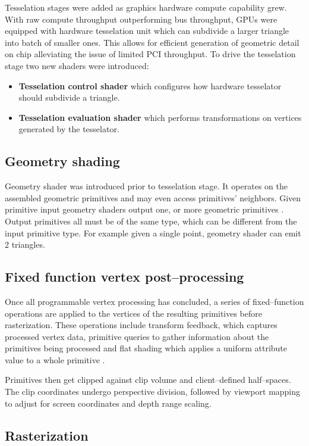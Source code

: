 Tesselation stages were added as graphics hardware compute capability grew. With raw compute throughput outperforming bus throughput, GPUs were equipped with hardware
tesselation unit which can subdivide a larger triangle into batch of smaller ones. This allows for efficient generation of geometric detail on chip alleviating the 
issue of limited PCI throughput.
To drive the tesselation stage two new shaders were introduced:
\begin{itemize}
    \item \textbf{Tesselation control shader} which configures how hardware tesselator should subdivide a triangle.
    \item \textbf{Tesselation evaluation shader} which performs transformations on vertices generated by the tesselator.
\end{itemize}

\subsection{Geometry shading}

Geometry shader was introduced prior to tesselation stage. It operates on the assembled geometric primitives and may even access primitives' neighbors.
Given primitive input geometry shaders output one, or more geometric primitives \cite{openglspec}. 
Output primitives all must be of the same type, which can be different from the input primitive type.
For example given a single point, geometry shader can emit 2 triangles.

\subsection{Fixed function vertex post--processing}

Once all programmable vertex processing has concluded, a series of fixed--function operations are applied to the vertices of the resulting primitives before rasterization.
These operations include transform feedback, which captures processed vertex data, 
primitive queries to gather information about the primitives being processed 
and flat shading which applies a uniform attribute value to a whole primitive \cite{openglspec}.

Primitives then get clipped against clip volume and client--defined half--spaces.
The clip coordinates undergo perspective division, followed by viewport mapping to adjust for screen coordinates and depth range scaling.

\subsection{Rasterization}

